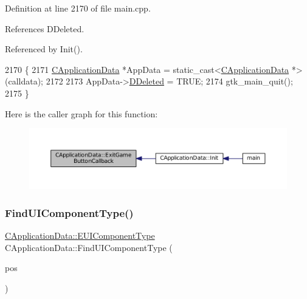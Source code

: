 Definition at line 2170 of file main.\+cpp.



References D\+Deleted.



Referenced by Init().


\begin{DoxyCode}
2170                                                            \{
2171     \hyperlink{classCApplicationData}{CApplicationData} *AppData = \textcolor{keyword}{static\_cast<}\hyperlink{classCApplicationData}{CApplicationData} *\textcolor{keyword}{>}(calldata);
2172     
2173     AppData->\hyperlink{classCApplicationData_a0a8651f95f3d48befd6e02a286ecdc82}{DDeleted} = TRUE;
2174     gtk\_main\_quit();
2175 \}
\end{DoxyCode}
Here is the caller graph for this function\+:\nopagebreak
\begin{figure}[H]
\begin{center}
\leavevmode
\includegraphics[width=350pt]{classCApplicationData_a6a2c934fee258ccdb2a4a70c075f79fd_icgraph}
\end{center}
\end{figure}
\hypertarget{classCApplicationData_a1fb2747750babd9b82f51ce206ee6755}{}\label{classCApplicationData_a1fb2747750babd9b82f51ce206ee6755} 
\subsubsection{\texorpdfstring{Find\+U\+I\+Component\+Type()}{FindUIComponentType()}}
{\footnotesize\ttfamily \hyperlink{classCApplicationData_ad49585591fc53bff1c89bc512170280d}{C\+Application\+Data\+::\+E\+U\+I\+Component\+Type} C\+Application\+Data\+::\+Find\+U\+I\+Component\+Type (\begin{DoxyParamCaption}\item[{const \hyperlink{classCPosition}{C\+Position} \&}]{pos }\end{DoxyParamCaption})\hspace{0.3cm}{\ttfamily [protected]}}



